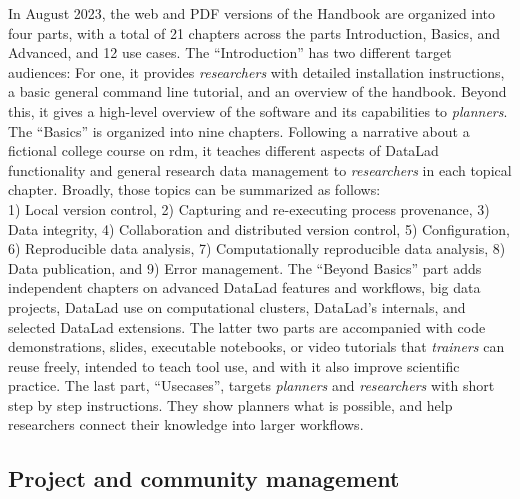 In August 2023, the web and PDF versions of the Handbook are organized into four parts, with a total of 21 chapters across the parts Introduction, Basics, and Advanced, and 12 use cases.
The ``Introduction'' has two different target audiences:
For one, it provides \textit{researchers} with detailed installation instructions, a basic general command line tutorial, and an overview of the handbook.
Beyond this, it gives a high-level overview of the software and its capabilities to \textit{planners}. \\
The ``Basics'' is organized into nine chapters.
Following a narrative about a fictional college course on \gls{rdm}, it teaches different aspects of DataLad functionality and general research data management to \textit{researchers} in each topical chapter.
Broadly, those topics can be summarized as follows: \\
1) Local version control, 2) Capturing and re-executing process provenance, 3) Data integrity, 4) Collaboration and distributed version control, 5) Configuration, 6) Reproducible data analysis, 7) Computationally reproducible data analysis, 8) Data publication, and 9) Error management.
The ``Beyond Basics'' part adds independent chapters on advanced DataLad features and workflows, big data projects, DataLad use on computational clusters, DataLad's internals, and selected DataLad extensions.
The latter two parts are accompanied with code demonstrations, slides, executable notebooks, or video tutorials that \textit{trainers} can reuse freely, intended to teach tool use, and with it also improve scientific practice.
The last part, ``Usecases'', targets \textit{planners} and \textit{researchers} with short step by step instructions.
They show planners what is possible, and help researchers connect their knowledge into larger workflows.

\subsection{Project and community management}

